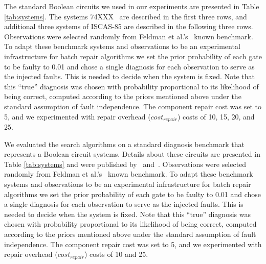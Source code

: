The standard Boolean circuits we used in our experiments are presented in Table \ref{tab:systems}. The systems {\small 74XXX}~\cite{Hansen99} are described in the first three rows, and additional three systems of {\small ISCAS-85} \cite{Brglez89} are described in the following three rows. Observations were selected randomly from Feldman et al.'s~ known benchmark.
To adapt these benchmark systems and observations to be an experimental infrastructure for batch repair algorithms we set the prior probability of each gate to be faulty to 0.01 and chose a single diagnosis for each observation to serve as the injected faults. This is needed to decide when the system is fixed. Note that this ``true'' diagnosis was chosen with probability proportional to its likelihood of being correct, computed according to the priors mentioned above under the standard assumption of fault independence. The component repair cost was set to 5, and we experimented with repair overhead ($cost_{repair}$) costs of 10, 15, 20, and 25.


We evaluated the search algorithms on a standard diagnosis benchmark that represents a Boolean circuit systems. Details about these circuits are presented in Table \ref{tab:systems} and were published by~\cite{Hansen99} and~\cite{Brglez89}.  
Observations were selected randomly from Feldman et al.'s~ known benchmark.
To adapt these benchmark systems and observations to be an experimental infrastructure for batch repair algorithms we set the prior probability of each gate to be faulty to 0.01 and chose a single diagnosis for each observation to serve as the injected faults. This is needed to decide when the system is fixed. Note that this ``true'' diagnosis was chosen with probability proportional to its likelihood of being correct, computed according to the priors mentioned above under the standard assumption of fault independence. The component repair cost was set to 5, and we experimented with repair overhead ($cost_{repair}$) costs of 10 and 25.

